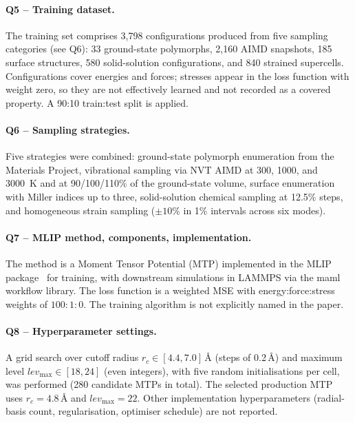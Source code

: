 \paragraph{Q5 -- Training dataset.}
The training set comprises 3{,}798 configurations produced from five
sampling categories (see Q6): 33 ground-state polymorphs, 2{,}160
AIMD snapshots, 185 surface structures, 580 solid-solution
configurations, and 840 strained supercells. Configurations cover
energies and forces; stresses appear in the loss function with weight
zero, so they are not effectively learned and not recorded as a
covered property. A 90:10 train:test split is applied.


\paragraph{Q6 -- Sampling strategies.}
Five strategies were combined: ground-state polymorph enumeration
from the Materials Project, vibrational sampling via NVT AIMD at 300,
1000, and 3000~K and at 90/100/110\% of the ground-state volume,
surface enumeration with Miller indices up to three, solid-solution
chemical sampling at 12.5\% steps, and homogeneous strain sampling
($\pm10\%$ in 1\% intervals across six modes).


\paragraph{Q7 -- MLIP method, components, implementation.}
The method is a Moment Tensor Potential (MTP) implemented in the MLIP
package~\cite{shapeev2016mtp,novikov2021mlip} for training,
with downstream simulations in LAMMPS via the maml workflow library.
The loss function is a weighted MSE with energy:force:stress weights
of $100{:}1{:}0$. The training algorithm is not explicitly named in
the paper.


\paragraph{Q8 -- Hyperparameter settings.}
A grid search over cutoff radius $r_c \in [4.4, 7.0]$\,\AA{} (steps of
0.2\,\AA) and maximum level $\mathit{lev}_{\max} \in [18, 24]$ (even
integers), with five random initialisations per cell, was performed
(280 candidate MTPs in total). The selected production MTP uses
$r_c = 4.8$\,\AA{} and $\mathit{lev}_{\max} = 22$. Other implementation
hyperparameters (radial-basis count, regularisation, optimiser
schedule) are not reported.


